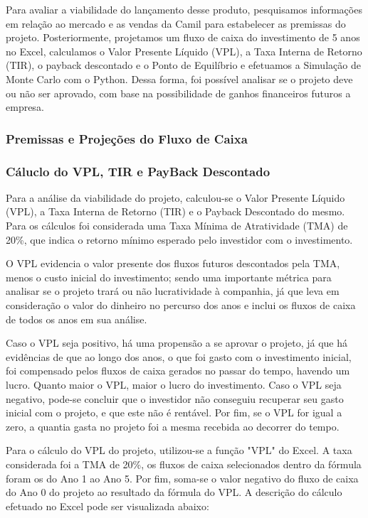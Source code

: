 \documentclass[a4paper,12pt]{article}[abntex2]
\begin{document}
Para avaliar a viabilidade do lançamento desse produto, pesquisamos informações em relação ao mercado e as vendas da Camil para estabelecer as premissas do projeto. Posteriormente, projetamos um fluxo de caixa do investimento de 5 anos no Excel, calculamos o Valor Presente Líquido (VPL), a Taxa Interna de Retorno (TIR), o payback descontado e o Ponto de Equilíbrio e efetuamos a Simulação de Monte Carlo com o Python. Dessa forma, foi possível analisar se o projeto deve ou não ser aprovado, com base na possibilidade de ganhos financeiros futuros a empresa.

\subsubsection{\textbf{Premissas e Projeções do Fluxo de Caixa}}
\subsubsection{\textbf{Cáluclo do VPL, TIR e PayBack Descontado}}
Para a análise da viabilidade do projeto, calculou-se o Valor Presente Líquido (VPL), a Taxa Interna de Retorno (TIR) e o Payback Descontado do mesmo. Para os cálculos foi considerada uma Taxa Mínima de Atratividade (TMA) de 20\%, que indica o retorno mínimo esperado pelo investidor com o investimento. 

O VPL evidencia o valor presente dos fluxos futuros descontados pela TMA, menos o custo inicial do investimento; sendo uma importante métrica para analisar se o projeto trará ou não lucratividade à companhia, já que leva em consideração o valor do dinheiro no percurso dos anos e inclui os fluxos de caixa de todos os anos em sua análise. 

Caso o VPL seja positivo, há uma propensão a se aprovar o projeto, já que há evidências de que ao longo dos anos, o que foi gasto com o investimento inicial, foi compensado pelos fluxos de caixa gerados no passar do tempo, havendo um lucro. Quanto maior o VPL, maior o lucro do investimento. Caso o VPL seja negativo, pode-se concluir que o investidor não conseguiu recuperar seu gasto inicial com o projeto, e que este não é rentável. Por fim, se o VPL for igual a zero, a quantia gasta no projeto foi a mesma recebida ao decorrer do tempo. 

Para o cálculo do VPL do projeto, utilizou-se a função "VPL" do Excel. A taxa considerada foi a TMA de 20\%, os fluxos de caixa selecionados dentro da fórmula foram os do Ano 1 ao Ano 5. Por fim, soma-se o valor negativo do fluxo de caixa do Ano 0 do projeto ao resultado da fórmula do VPL. A descrição do cálculo efetuado no Excel pode ser visualizada abaixo:
\end{document}
